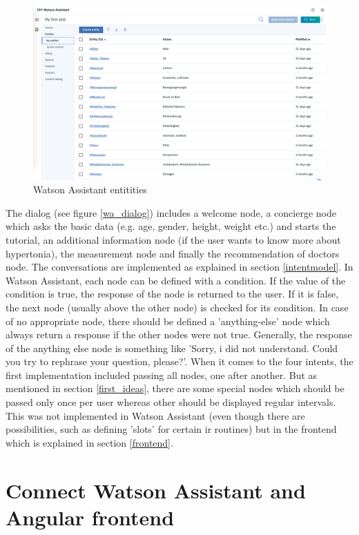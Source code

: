 \begin{figure}[ht]
	\centering
	\includegraphics[width=1\textwidth]{images/WA_entities.png}
	\caption{Watson Assistant entitities}
	\label{wa_entities}
\end{figure}
The dialog (see figure \ref{wa_dialog}) includes a welcome node, a concierge node which asks the basic data (e.g. age, gender, height, weight etc.) and starts the tutorial, an additional information node (if the user wants to know more about hypertonia), the measurement node and finally the recommendation of doctors node. The conversations are implemented as explained in section \ref{intentmodel}. In Watson Assistant, each node can be defined with a condition. If the value of the condition is true, the response of the node is returned to the user. If it is false, the next node (usually above the other node) is checked for its condition. In case of no appropriate node, there should be defined a 'anything-else' node which always return a response if the other nodes were not true. Generally, the response of the anything else node is something like 'Sorry, i did not understand. Could you try to rephrase your question, please?'.
When it comes to the four intents, the first implementation included passing all nodes, one after another. But as mentioned in section \ref{first_ideas}, there are some special nodes which should be passed only once per user whereas other should be displayed regular intervals. This was not implemented in Watson Assistant (even though there are possibilities, such as defining 'slots' for certain \ac{ir} routines) but in the frontend which is explained in section \ref{frontend}. 

\section{Connect Watson Assistant and Angular frontend}

